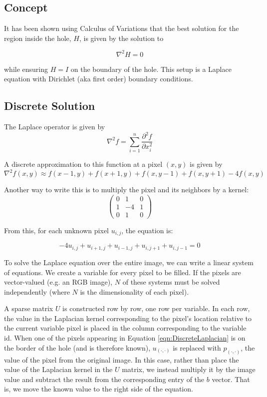 \documentclass{InsightArticle}
\begin{document}
\subsection{Concept}
It has been shown using Calculus of Variations that the best solution for the region inside the hole, $H$, is given by the solution to 

\begin{equation}
\nabla^2 H = 0
\end{equation}

while ensuring $H=I$ on the boundary of the hole. This setup is a Laplace equation with Dirichlet (aka first order) boundary conditions. 

\subsection{Discrete Solution}
The Laplace operator is given by
\begin{equation}
 \nabla^2 f = \sum_{i=1}^n \frac{\partial^2 f}{\partial x_i^2}
\end{equation}

A discrete approximation to this function at a pixel $(x,y)$ is given by
\begin{equation}
 \nabla^2 f(x,y) \approx f(x-1,y) + f(x+1,y) + f(x,y-1) + f(x,y+1) - 4f(x,y)
\end{equation}

Another way to write this is to multiply the pixel and its neighbors by a kernel:
\begin{equation}
\begin{pmatrix}
0 & 1 & 0 \\
1 & -4 & 1\\
0 & 1 & 0
\end{pmatrix}
\end{equation}


From this, for each unknown pixel $u_{i,j}$, the equation is:

\begin{equation}
\label{eqn:DiscreteLaplacian}
-4 u_{i,j} + u_{i+1,j} + u_{i-1,j} + u_{i,j+1} + u_{i,j-1} = 0
\end{equation}

To solve the Laplace equation over the entire image, we can write a linear system of equations. We create a variable for every pixel to be filled. If the pixels are vector-valued (e.g. an RGB image), $N$ of these systems must be solved independently (where $N$ is the dimensionality of each pixel).

A sparse matrix $U$ is constructed row by row, one row per variable. In each row, the value in the Laplacian kernel corresponding to the pixel's location relative to the current variable pixel is placed in the column corresponding to the variable id. When one of the pixels appearing in Equation \ref{eqn:DiscreteLaplacian} is on the border of the hole (and is therefore known), $u_{(\cdot,\cdot)}$ is replaced with $p_{(\cdot,\cdot)}$, the value of the pixel from the original image. In this case, rather than place the value of the Laplacian kernel in the $U$ matrix, we instead multiply it by the image value and subtract the result from the corresponding entry of the $b$ vector. That is, we move the known value to the right side of the equation.
\end{document}
